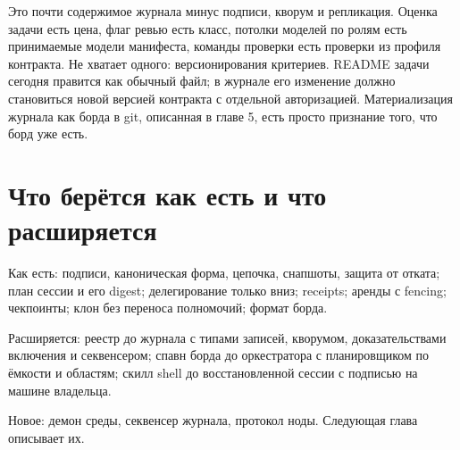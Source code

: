 Это почти содержимое журнала минус подписи, кворум и репликация. Оценка задачи есть цена, флаг ревью есть класс, потолки моделей по ролям есть принимаемые модели манифеста, команды проверки есть проверки из профиля контракта. Не хватает одного: версионирования критериев. README задачи сегодня правится как обычный файл; в журнале его изменение должно становиться новой версией контракта с отдельной авторизацией. Материализация журнала как борда в git, описанная в главе 5, есть просто признание того, что борд уже есть.

\section{Что берётся как есть и что расширяется}

Как есть: подписи, каноническая форма, цепочка, снапшоты, защита от отката; план сессии и его digest; делегирование только вниз; receipts; аренды с fencing; чекпоинты; клон без переноса полномочий; формат борда.

Расширяется: реестр до журнала с типами записей, кворумом, доказательствами включения и секвенсером; спавн борда до оркестратора с планировщиком по ёмкости и областям; скилл shell до восстановленной сессии с подписью на машине владельца.

Новое: демон среды, секвенсер журнала, протокол ноды. Следующая глава описывает их.
